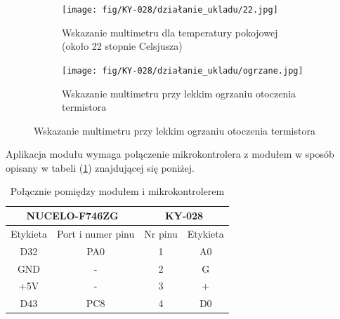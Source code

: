 \documentclass[11pt, a4paper]{article}
\begin{document}
\vspace{0.5cm}
\vspace{0.25cm}
\begin{figure}[h]
\centering
\begin{subfigure}{.5\textwidth}
\centering
\texttt{[image: fig/KY-028/działanie\_ukladu/22.jpg]}
\caption{\centering Wskazanie multimetru dla temperatury pokojowej (około 22 stopnie Celsjusza)}
\label{fig:_uklad_woltomierz_otw}
\end{subfigure}%
\begin{subfigure}{.5\textwidth}
\centering
\texttt{[image: fig/KY-028/działanie\_ukladu/ogrzane.jpg]}
\caption{\centering Wskazanie multimetru przy lekkim ogrzaniu otoczenia termistora}
\label{fig:_uklad_woltomierz_zmk}
\end{subfigure}
\label{fig:woltomierz}
\end{figure}
\vspace{0.25cm}
\vspace{0.5cm}
Aplikacja modułu wymaga połączenie mikrokontrolera z modułem w sposób opisany w tabeli (\ref{tab:tab1}) znajdującej się poniżej.

\vspace{0.5cm}
\begin{table}[h!]
    \centering
    \begin{tabular}{|c|c|c|c|} 
        \hline
        \multicolumn{2}{|c|}{NUCELO-F746ZG} & \multicolumn{2}{c|}{KY-028}  \\ 
        \hline
        Etykieta & Port i numer pinu       & Nr pinu & Etykieta           \\ 
        \hline
        D32      & PA0                     & 1       & A0             
        \\
        \hline
        GND      & -                    & 2       & G           
        \\
        \hline
        +5V      & -                      & 3       & +              \\
        \hline
        D43      & PC8                       & 4       & D0              \\
        \hline
    \end{tabular}
    \caption{Połącznie pomiędzy modułem i mikrokontrolerem}
    \label{tab:tab1}
\end{table}
\end{document}
